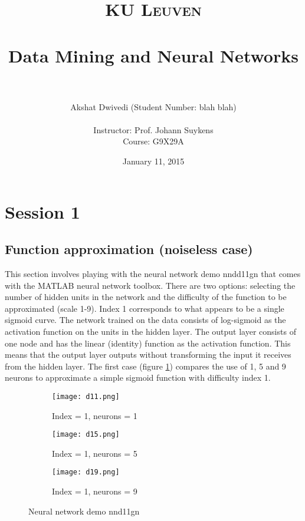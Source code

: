 \documentclass[paper=a4, fontsize=11pt]{scrartcl} %
\title{	
\normalfont \normalsize 
\textsc{\Large KU Leuven} \\ [30pt] %
\horrule{0.5pt} \\[0.4cm] %
\huge Data Mining and Neural Networks \\ %
\horrule{2pt} \\[0.5cm] %
}
\author{Akshat Dwivedi (Student Number: blah blah)\\
\\
Instructor: Prof. Johann Suykens\\
Course: G9X29A} %
\date{January 11, 2015} %
\numberwithin{equation}{section} %
\begin{document}
\maketitle %

\tableofcontents

\clearpage
\setcounter{page}{1}



\section{Session 1}

\subsection{Function approximation (noiseless case)}
This section involves playing with the neural network demo nndd11gn that comes with the MATLAB neural network toolbox. There are two options: selecting the number of hidden units in the network and the difficulty of the function to be approximated (scale 1-9). Index 1 corresponds to what appears to be a single sigmoid curve. The network trained on the data consists of log-sigmoid as the activation function on the units in the hidden layer. The output layer consists of one node and has the linear (identity) function as the activation function. This means that the output layer outputs without transforming the input it receives from the hidden layer. The first case (figure \ref{demo1}) compares the use of 1, 5 and 9 neurons to approximate a simple sigmoid function with difficulty index 1.

\begin{figure}[ht]
\centering
	\begin{subfigure}[b]{0.3\textwidth}
		\centering
		\texttt{[image: d11.png]}
		\caption{Index = 1, neurons = 1}
	\end{subfigure}
	\begin{subfigure}[b]{0.3\textwidth}
		\centering
		\texttt{[image: d15.png]}
		\caption{Index = 1, neurons = 5}
	\end{subfigure}
	\begin{subfigure}[b]{0.3\textwidth}
		\centering
		\texttt{[image: d19.png]}
		\caption{Index = 1, neurons = 9}
	\end{subfigure}
\caption{Neural network demo nnd11gn}
\label{demo1}
\end{figure}
\end{document}
